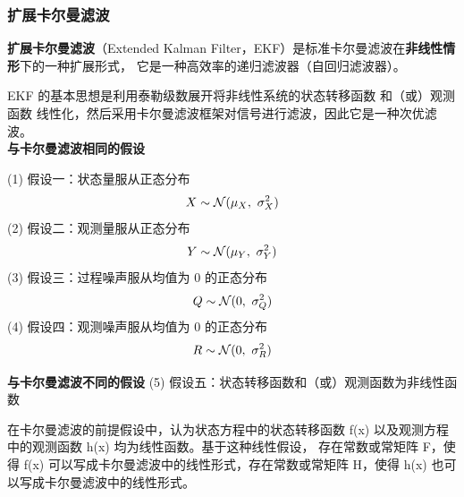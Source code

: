 \documentclass[12pt]{ctexart}
\begin{document}
\begin{lstlisting}

\end{lstlisting}







\subsubsection{扩展卡尔曼滤波}
\textbf{扩展卡尔曼滤波}（Extended Kalman Filter，EKF）是标准卡尔曼滤波在\textbf{非线性情形}下的一种扩展形式，
它是一种高效率的递归滤波器（自回归滤波器）。
\par
EKF 的基本思想是利用泰勒级数展开将非线性系统的状态转移函数 
和（或）观测函数 线性化，然后采用卡尔曼滤波框架对信号进行滤波，因此它是一种次优滤波。
~\\
\textcolor{myblue}{\textbf{与卡尔曼滤波相同的假设}}

(1) 假设一：状态量服从正态分布
\[
X \sim \mathcal{N}(\mu_X, \ \sigma_X^2) \\
\]
(2) 假设二：观测量服从正态分布
\[
Y \sim \mathcal{N}(\mu_Y, \ \sigma_Y^2) \\
\]
(3) 假设三：过程噪声服从均值为 0 的正态分布
\[
Q \sim \mathcal{N}(0, \ \sigma_Q^2) \\
\]
(4) 假设四：观测噪声服从均值为 0 的正态分布
\[
R \sim \mathcal{N}(0, \ \sigma_R^2) \\
\]

\textcolor{myblue}{\textbf{与卡尔曼滤波不同的假设}}
(5) 假设五：状态转移函数和（或）观测函数为非线性函数

在卡尔曼滤波的前提假设中，认为状态方程中的状态转移函数 f(x) 以及观测方程中的观测函数 h(x) 均为线性函数。基于这种线性假设，
存在常数或常矩阵 F，使得 f(x) 可以写成卡尔曼滤波中的线性形式，存在常数或常矩阵 H，使得 h(x) 也可以写成卡尔曼滤波中的线性形式。
\end{document}

